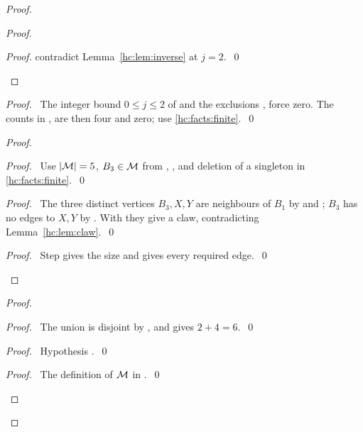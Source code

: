\begin{mergedproofsection}
\begin{proof}
\begin{proof}
\begin{proof}
    contradict Lemma~\ref{hc:lem:inverse} at $j=2$.~\qed\end{proof}
 \end{proof}
 \begin{proof}\pf\ The integer bound $0\le j\le2$ of
   and the exclusions
  ,  force zero.
  The counts in , 
  are then four and zero; use \ref{hc:facts:finite}.~\qed\end{proof}
 \begin{proof}
  \begin{proof}\pf\ Use $|{\mathcal M}|=5$, $B_3\in{\mathcal M}$ from
   , , and
   deletion of a singleton in \ref{hc:facts:finite}.~\qed\end{proof}
  \begin{proof}\pf\ The three distinct vertices $B_3,X,Y$ are
   neighbours of $B_1$ by  and
   ; $B_3$ has no edges to $X,Y$ by
   . With  they give a claw,
   contradicting Lemma~\ref{hc:lem:claw}.~\qed\end{proof}
  \qedstep
  \begin{proof}\pf\ Step  gives the size and
    gives every required edge.~\qed\end{proof}
 \end{proof}
 \begin{proof}
  \begin{proof}\pf\ The union is disjoint by
   , and  gives $2+4=6$.~\qed\end{proof}
  \begin{proof}\pf\ Hypothesis .~\qed\end{proof}
  \begin{proof}\pf\ The definition of ${\mathcal M}$ in .~\qed\end{proof}

\end{proof}
\end{proof}
\end{mergedproofsection}
